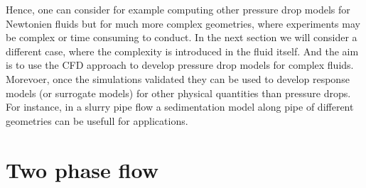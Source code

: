 \documentclass[11pt]{report}
\begin{document}
\begin{minipage}[t]{0.35\textwidth}
\begin{minipage}[t]{0.5\textwidth}
\begin{minipage}[t]{0.35\textwidth}
\begin{minipage}[t]{0.35\textwidth}
%
Hence, one can consider for example computing other pressure drop models for Newtonien fluids but for much more complex geometries, where experiments may be complex or time consuming to conduct. 
%
In the next section we will consider a different case, where the complexity is introduced in the fluid itself. And the aim is to use the CFD approach to develop pressure drop models for complex fluids.
%
Morevoer, once the simulations validated they can be used to develop response models (or surrogate models) for other physical quantities than pressure drops. 
%
For instance, in a slurry pipe flow a sedimentation model along pipe of different geometries can be usefull for applications.  

\section{Two phase flow} \label{Two Phase}


\end{minipage}
\end{minipage}
\end{minipage}
\end{minipage}
\end{document}
